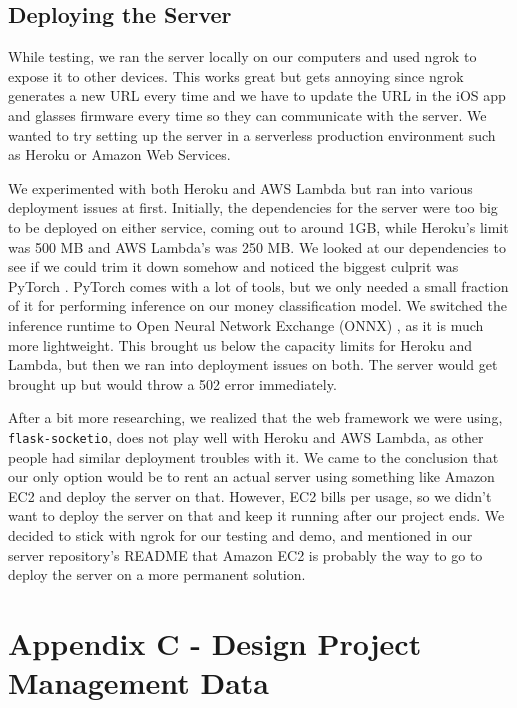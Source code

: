 \documentclass[a4paper,11pt]{article}
\begin{document}
\newpage
\subsection{Deploying the Server}
While testing, we ran the server locally on our computers and used ngrok \cite{ngrok} to expose it to other devices. This works great but gets annoying since ngrok generates a new URL every time and we have to update the URL in the iOS app and glasses firmware every time so they can communicate with the server. We wanted to try setting up the server in a serverless production environment such as Heroku \cite{heroku} or Amazon Web Services.

We experimented with both Heroku and AWS Lambda \cite{aws-lambda} but ran into various deployment issues at first. Initially, the dependencies for the server were too big to be deployed on either service, coming out to around 1GB, while Heroku's limit was 500 MB and AWS Lambda's was 250 MB. We looked at our dependencies to see if we could trim it down somehow and noticed the biggest culprit was PyTorch \cite{pytorch}. PyTorch comes with a lot of tools, but we only needed a small fraction of it for performing inference on our money classification model. We switched the inference runtime to Open Neural Network Exchange (ONNX) \cite{onnx}, as it is much more lightweight. This brought us below the capacity limits for Heroku and Lambda, but then we ran into deployment issues on both. The server would get brought up but would throw a 502 error immediately. 

After a bit more researching, we realized that the web framework we were using, \texttt{flask-socketio}, does not play well with Heroku and AWS Lambda, as other people had similar deployment troubles with it. We came to the conclusion that our only option would be to rent an actual server using something like Amazon EC2 \cite{aws-ec2} and deploy the server on that. However, EC2 bills per usage, so we didn't want to deploy the server on that and keep it running after our project ends. We decided to stick with ngrok for our testing and demo, and mentioned in our server repository's README that Amazon EC2 is probably the way to go to deploy the server on a more permanent solution.



\section{Appendix C - Design Project Management Data}
\label{appendix-c}
\end{document}
